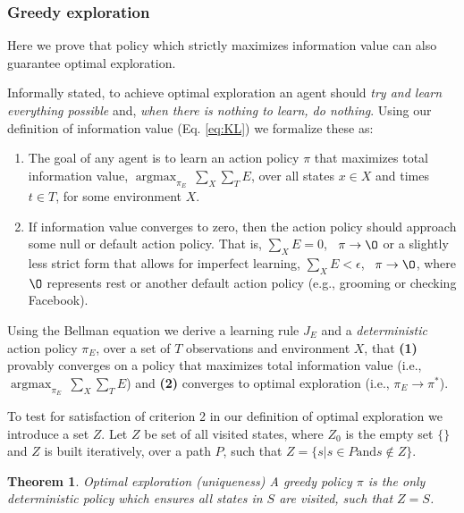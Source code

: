 \documentclass[9pt,twocolumn,twoside]{pnas-new}
\DeclareMathOperator*{\argmax}{argmax}
\newtheorem{theorem}{Theorem}
\begin{document}
{{%
\subsubsection*{Greedy exploration} 
Here we prove that policy which strictly maximizes information value can also guarantee optimal exploration. 

Informally stated, to achieve optimal exploration an agent should \textit{try and learn everything possible} and, \textit{when there is nothing to learn, do nothing}. Using our definition of information value (Eq. \ref{eq:KL}) we formalize these as:

\begin{enumerate}[noitemsep,wide=0pt,leftmargin=\dimexpr\labelwidth+2\labelsep\relax]
    \item The goal of any agent is to learn an action policy $\pi$ that maximizes total information value, $\argmax_{\pi_E} \ \sum_X \sum_T E$, over all states $x \in X$ and times $t \in T$, for some environment $X$.
    \item If information value converges to zero, then the action policy should approach some null or default action policy. That is, $\sum_X E = 0$, \ $\pi \rightarrow \O$ or a slightly less strict form that allows for imperfect learning, $\sum_X E < \epsilon $, \ $\pi \rightarrow \O$, where $\O$ represents rest or another default action policy (e.g., grooming or checking Facebook).
\end{enumerate}

Using the Bellman equation we derive a learning rule $J_E$ and a \textit{deterministic} action policy $\pi_E$, over a set of $T$ observations and environment $X$, that \textbf{(1)} provably converges on a policy that maximizes total information value (i.e., $\argmax_{\pi_E} \ \sum_X \sum_T E$) and \textbf{(2)} converges to optimal exploration (i.e., $\pi_E \rightarrow \pi^*$).

To test for satisfaction of criterion 2 in our definition of optimal exploration we introduce a set $Z$. Let $Z$ be set of all visited states, where $Z_0$ is the empty set $\{\}$ and $Z$ is built iteratively, over a path $P$, such that $Z = \{s | s \in P \text{and} s \not\in Z\}$.

\begin{theorem}{Optimal exploration (uniqueness)}
A greedy policy $\pi$ is the only deterministic policy which ensures all states in $S$ are visited, such that $Z = S$.
\end{theorem}

}}
\end{document}
